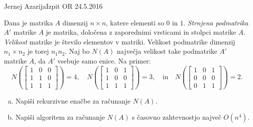 \begin{naloga}{Jernej Azarija}{Izpit OR 24.5.2016}
\begin{vprasanje}
Dana je matrika $A$ dimenzij $n \times n$, katere elementi so $0$ in $1$.
{\em Strnjena podmatrika} $A'$ matrike $A$ je matrika,
določena z zaporednimi vrsticami in stolpci matrike $A$.
{\em Velikost} matrike je število elementov v matriki.
Velikost podmatrike dimenzij $n_1 \times n_2$ je torej $n_1 n_2$.
Naj bo $N(A)$ največja velikost take podmatrike $A'$ matrike $A$,
da $A'$ vsebuje samo enice.
Na primer:
$$
N\left(\begin{bmatrix}
1 & 0 & 0 \\
1 & 1 & 0 \\
1 & 1 & 1
\end{bmatrix}\right) = 4, \quad
N\left(\begin{bmatrix}
1 & 0 & 1 \\
1 & 0 & 0 \\
1 & 1 & 1
\end{bmatrix}\right) = 3, \quad \text{in} \quad
N\left(\begin{bmatrix}
1 & 0 & 1 \\
0 & 0 & 0 \\
0 & 1 & 1
\end{bmatrix}\right) = 2.
$$

\begin{enumerate}[(a)]
\item Napiši rekurzivne enačbe za računanje $N(A)$.

\item Napiši algoritem za računanje $N(A)$
s časovno zahtevnostjo največ $O(n^4)$.
\end{enumerate}
\end{vprasanje}
\begin{odgovor}
\end{odgovor}
\end{naloga}

